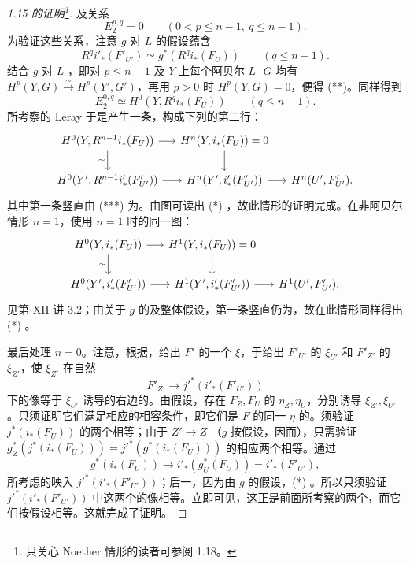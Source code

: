\begin{proof}[1.15 的证明\footnote{只关心 Noether 情形的读者可参阅 1.18。}]
及关系
\[E_2^{p,q}=0\qquad(0<p\leq n-1,\ q\leq n-1).\tag{**}\]
为验证这些关系，注意 $g$ 对 $L$ 的假设蕴含
\[R^qi'_*(F'_{U'})\simeq g^*(R^qi_*(F_U))\qquad(q\leq n-1).\]
结合 $g$ 对 $L$ ，即对 $p\leq n-1$ 及 $Y$ 上每个阿贝尔 $L$- $G$ 均有 $H^p(Y,G)\xrightarrow{\sim}H^p(Y',G')$，再用 $p>0$ 时 $H^p(Y,G)=0$，便得 (**)。同样得到
\[E_2^{0,q}\simeq H^0(Y,R^qi_*(F_U))\qquad(q\leq n-1).\tag{***}\]
所考察的 Leray 于是产生一条，构成下列的第二行：
\[
\begin{tikzcd}[column sep=small]
H^0(Y,R^{n-1}i_*(F_U))\arrow[r]\arrow[d,"\sim"']&H^n(Y,i_*(F_U))=0\arrow[d]&\\
H^0(Y',R^{n-1}i'_*(F'_{U'}))\arrow[r]&H^n(Y',i'_*(F'_{U'}))\arrow[r]&H^n(U',F'_{U'}).
\end{tikzcd}
\]
其中第一条竖直由 (***) 为。由图可读出 (*) ，故此情形的证明完成。在非阿贝尔情形 $n=1$，使用 $n=1$ 时的同一图：
\[
\begin{tikzcd}[column sep=small]
H^0(Y,i_*(F_U))\arrow[r]\arrow[d,"\sim"']&H^1(Y,i_*(F_U))=0\arrow[d]&\\
H^0(Y',i'_*(F'_{U'}))\arrow[r]&H^1(Y',i'_*(F'_{U'}))\arrow[r]&H^1(U',F'_{U'}),
\end{tikzcd}
\]
见第 XII 讲 3.2；由关于 $g$ 的及整体假设，第一条竖直仍为，故在此情形同样得出 (*) 。

最后处理 $n=0$。注意，根据，给出 $F'$ 的一个 $\xi$，于给出 $F'_{U'}$ 的 $\xi_{U'}$ 和 $F'_{Z'}$ 的 $\xi_{Z'}$，使 $\xi_{Z'}$ 在自然
\[F'_{Z'}\longrightarrow j'^*(i'_*(F'_{U'}))\]
下的像等于 $\xi_{U'}$ 诱导的右边的。由假设，存在 $F_Z,F_U$ 的 $\eta_Z,\eta_U$，分别诱导 $\xi_{Z'},\xi_{U'}$。只须证明它们满足相应的相容条件，即它们是 $F$ 的同一 $\eta$ 的。须验证 $j^*(i_*(F_U))$ 的两个相等；由于 $Z'\to Z$ （$g$ 按假设，因而），只需验证 $g_Z^*(j^*(i_*(F_U)))=j'^*(g^*(i_*(F_U)))$ 的相应两个相等。通过
\[g^*(i_*(F_U))\longrightarrow i'_*(g_U^*(F_U))=i'_*(F'_{U'}),\tag{*}\]
所考虑的映入 $j'^*(i'_*(F'_{U'}))$；后一，因为由 $g$ 的假设，(*) 。所以只须验证 $j'^*(i'_*(F'_{U'}))$ 中这两个的像相等。立即可见，这正是前面所考察的两个，而它们按假设相等。这就完成了证明。
\end{proof}
